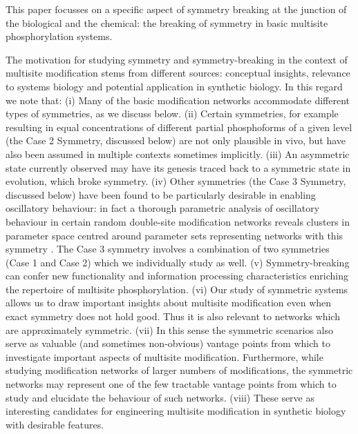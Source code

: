 \documentclass[9pt,lineno]{elife}
\begin{document}
  
This paper focusses on a specific aspect of  symmetry breaking at the junction of the biological and the chemical: the breaking of symmetry in basic multisite phosphorylation systems. 

The motivation for studying symmetry and symmetry-breaking in the context of multisite modification stems from different sources: conceptual insights, relevance to systems biology and  potential application  in synthetic biology. In this regard we note that: (i) Many of the basic modification networks accommodate different types of symmetries, as we discuss below. (ii) Certain symmetries, for example resulting in equal concentrations of different partial phosphoforms of a given level (the Case 2 Symmetry, discussed below) are not only plausible in vivo, but have also been assumed in multiple contexts sometimes implicitly. (iii) An asymmetric state currently observed may have its genesis traced back to a symmetric state in evolution, which broke symmetry. (iv) Other symmetries (the Case 3 Symmetry, discussed below) have been found to be particularly desirable in enabling oscillatory behaviour: in fact a thorough parametric analysis of oscillatory behaviour in certain random double-site modification networks reveals clusters in parameter space centred around parameter sets representing networks with this symmetry \cite{Jolley2012}. The Case 3 symmetry involves a combination of two symmetries (Case 1 and Case 2) which we individually study as well. (v) Symmetry-breaking can confer new functionality and information processing characteristics enriching the repertoire of multisite phosphorylation. (vi) Our study of symmetric systems allows us to draw important insights about multisite modification even when exact symmetry does not hold good. Thus it is also relevant to networks which are approximately symmetric. (vii) In this sense the symmetric scenarios also serve as valuable (and sometimes non-obvious) vantage points from which to investigate important aspects of multisite modification. Furthermore, while studying modification networks
of larger numbers of modifications, the symmetric networks may represent one of the few tractable vantage points from which to study and elucidate the behaviour of such networks.
(viii) These serve as interesting candidates for engineering multisite modification in synthetic biology with desirable features. 
\end{document}
